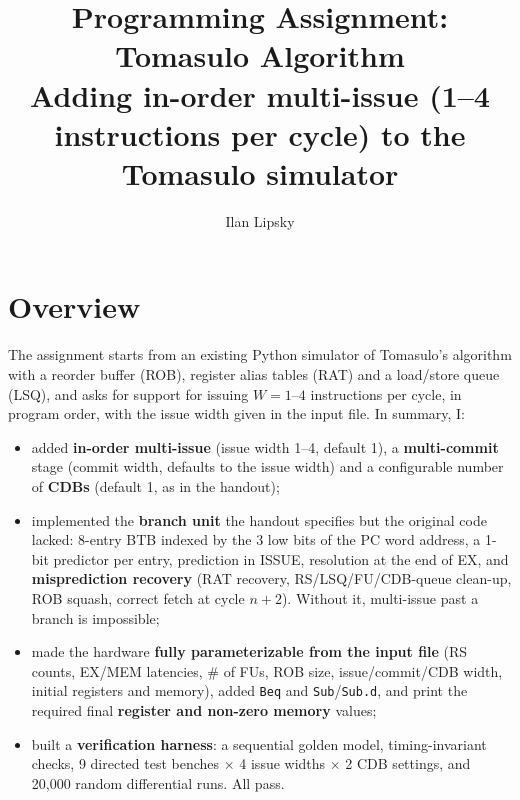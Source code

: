 \documentclass[11pt]{article}
\title{\textbf{Programming Assignment: Tomasulo Algorithm}\\[2pt]
\large Adding in-order multi-issue (1--4 instructions per cycle) to the Tomasulo simulator}
\author{Ilan Lipsky}
\date{}
\begin{document}
\maketitle
\thispagestyle{fancy}

\section{Overview}
The assignment starts from an existing Python simulator of Tomasulo's algorithm with a reorder
buffer (ROB), register alias tables (RAT) and a load/store queue (LSQ), and asks for support for
issuing $W = 1$--$4$ instructions per cycle, in program order, with the issue width given in the
input file. In summary, I:

\begin{itemize}
  \item added \textbf{in-order multi-issue} (issue width 1--4, default 1), a \textbf{multi-commit}
        stage (commit width, defaults to the issue width) and a configurable number of
        \textbf{CDBs} (default 1, as in the handout);
  \item implemented the \textbf{branch unit} the handout specifies but the original code lacked:
        8-entry BTB indexed by the 3 low bits of the PC word address, a 1-bit predictor per
        entry, prediction in ISSUE, resolution at the end of EX, and \textbf{misprediction
        recovery} (RAT recovery, RS/LSQ/FU/CDB-queue clean-up, ROB squash, correct fetch at
        cycle $n{+}2$). Without it, multi-issue past a branch is impossible;
  \item made the hardware \textbf{fully parameterizable from the input file} (RS counts, EX/MEM
        latencies, \# of FUs, ROB size, issue/commit/CDB width, initial registers and memory),
        added \texttt{Beq} and \texttt{Sub}/\texttt{Sub.d}, and print the required final
        \textbf{register and non-zero memory} values;
  \item built a \textbf{verification harness}: a sequential golden model, timing-invariant
        checks, 9 directed test benches $\times$ 4 issue widths $\times$ 2 CDB settings, and
        20{,}000 random differential runs. All pass.
\end{itemize}
\end{document}
